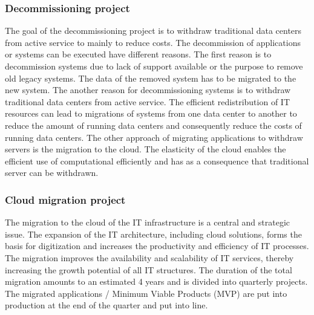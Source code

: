 \subsubsection{Decommissioning project}

The goal of the decommissioning project is to withdraw traditional data centers from active service to mainly to reduce costs. The decommission of applications or systems can be executed have different reasons. The first reason is to decommission systems due to lack of support available or the purpose to remove old legacy systems. The data of the removed system has to be migrated to the new system. The another reason for decommissioning systems is to withdraw traditional data centers from active service. The efficient redistribution of IT resources can lead to migrations of systems from one data center to another to reduce the amount of running data centers and consequently reduce the costs of running data centers. The other approach of migrating applications to withdraw servers is the migration to the cloud. The elasticity of the cloud enables the efficient use of computational efficiently and has as a consequence that traditional server can be withdrawn.

\subsubsection{Cloud migration project}
The migration to the cloud of the IT infrastructure is a central and strategic issue. The expansion of the IT architecture, including cloud solutions, forms the basis for digitization and increases the productivity and efficiency of IT processes. The migration improves the availability and scalability of IT services, thereby increasing the growth potential of all IT structures. The duration of the total migration amounts to an estimated 4 years and is divided into quarterly projects. The migrated applications / Minimum Viable Products (MVP) are put into production at the end of the quarter and put into line.

